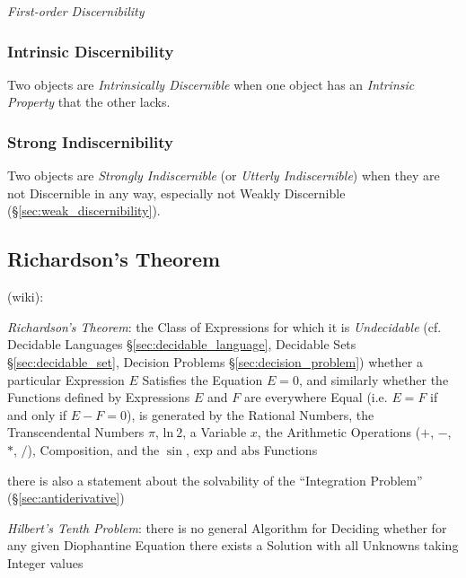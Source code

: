 \emph{First-order Discernibility}


\subsubsection{Intrinsic Discernibility}\label{sec:intrinsic_discernibility}


Two objects are \emph{Intrinsically Discernible} when one object has
an \emph{Intrinsic Property} that the other lacks.



\subsubsection{Strong Indiscernibility}\label{sec:strong_indiscernibility}

Two objects are \emph{Strongly Indiscernible} (or \emph{Utterly
  Indiscernible}) when they are not Discernible in any way, especially
not Weakly Discernible (\S\ref{sec:weak_discernibility}).



\subsection{Richardson's Theorem}\label{sec:richardsons_theorem}


(wiki):

\emph{Richardson's Theorem}: the Class of Expressions for which it is
\emph{Undecidable} (cf. Decidable Languages \S\ref{sec:decidable_language},
Decidable Sets \S\ref{sec:decidable_set}, Decision Problems
\S\ref{sec:decision_problem}) whether a particular Expression $E$ Satisfies the
Equation $E = 0$, and similarly whether the Functions defined by Expressions
$E$ and $F$ are everywhere Equal (i.e. $E = F$ if and only if $E - F = 0$), is
generated by the Rational Numbers, the Transcendental Numbers $\pi$,
$\mathrm{ln}\ 2$, a Variable $x$, the Arithmetic Operations ($+$, $-$, $*$,
$/$), Composition, and the $\sin$, $\mathrm{exp}$ and $\mathrm{abs}$ Functions

there is also a statement about the solvability of the ``Integration Problem''
(\S\ref{sec:antiderivative})

\emph{Hilbert's Tenth Problem}: there is no general Algorithm for Deciding
whether for any given Diophantine Equation there exists a Solution with all
Unknowns taking Integer values

